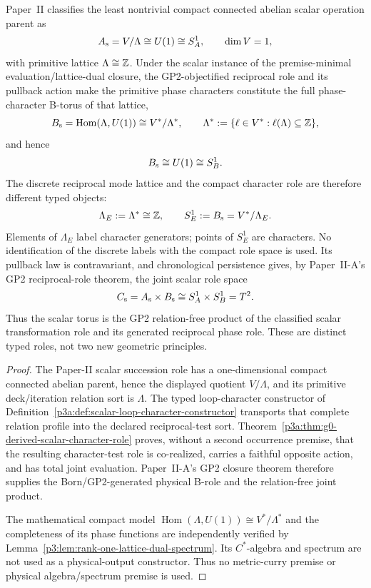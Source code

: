 \documentclass[12pt,a4paper]{article}
\begin{document}
\begin{theorem}
\label{p3:thm:scalar_classification_import}
Paper~II classifies the least nontrivial compact connected abelian scalar
operation parent as
\[
        A_{\rm s}=V/\Lambda\cong U(1)\cong S^1_A,
        \qquad \dim V=1,
\]
with primitive lattice \(\Lambda\cong\mathbb{Z}\).  Under the scalar instance of
the premise-minimal evaluation/lattice-dual closure, the GP2-objectified
reciprocal role and its pullback action make the primitive phase characters
constitute the
full phase-character B-torus of that lattice,
\[
    B_{\rm s}=\operatorname{Hom}(\Lambda,U(1))
    \cong V^*/\Lambda^*,
        \qquad
        \Lambda^*:=\{\ell\in V^*: \ell(\Lambda)\subseteq\mathbb{Z}\},
\]
and hence
\[
        B_{\rm s}\cong U(1)\cong S^1_B.
\]
The discrete reciprocal mode lattice and the compact character role are
therefore different typed objects:
\[
   \Lambda_E:=\Lambda^*\cong\mathbb Z,
   \qquad
   S^1_E:=B_{\rm s}=V^*/\Lambda_E.
\]
Elements of \(\Lambda_E\) label character generators; points of \(S^1_E\)
are characters.  No identification of the discrete labels with the compact
role space is used.
Its pullback law is contravariant, and chronological persistence gives, by
Paper~II-A's GP2 reciprocal-role theorem, the joint scalar role space
\[
        C_{\rm s}=A_{\rm s}\times B_{\rm s}
        \cong S^1_A\times S^1_B=T^2.
\]
Thus the scalar torus is the GP2 relation-free product of the classified
scalar transformation role and its generated reciprocal phase
role.  These are distinct typed roles, not two new geometric principles.
\end{theorem}

\begin{proof}
The Paper-II scalar succession role has a one-dimensional compact connected
abelian parent, hence the displayed quotient \(V/\Lambda\), and its primitive
deck/iteration relation sort is \(\Lambda\).  The typed loop-character
constructor of Definition~\ref{p3a:def:scalar-loop-character-constructor}
transports that complete relation profile into the declared reciprocal-test
sort.  Theorem~\ref{p3a:thm:g0-derived-scalar-character-role} proves, without
a second occurrence premise, that the resulting character-test role is
co-realized, carries a faithful opposite action, and has total joint
evaluation.  Paper~II-A's GP2 closure theorem therefore supplies the
Born/GP2-generated physical B-role and the relation-free joint product.

The mathematical compact model
\(\operatorname{Hom}(\Lambda,U(1))\cong V^*/\Lambda^*\)
and the completeness of its phase functions are independently verified
by Lemma~\ref{p3:lem:rank-one-lattice-dual-spectrum}.  Its \(C^*\)-algebra and spectrum are not used as a
physical-output constructor.  Thus no metric-curry premise or physical
algebra/spectrum premise is used.
\end{proof}
\end{document}
